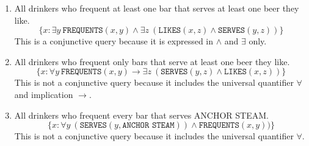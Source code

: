 \begin{enumerate}
  \item All drinkers who frequent at least one bar that serves at least one beer they like.
  \begin{equation*}
    \{x : \exists y \: \texttt{FREQUENTS}(x,y) \land \exists z \: (\texttt{LIKES}(x,z) \land \texttt{SERVES}(y,z))\}
  \end{equation*}
  This is a conjunctive query because it is expressed in $\land$ and $\exists$ only.
  
  \item All drinkers who frequent only bars that serve at least one beer they like.
  \begin{equation*}
    \{x : \forall y \: \texttt{FREQUENTS}(x,y) \rightarrow \exists z \: (\texttt{SERVES}(y,z) \land \texttt{LIKES}(x,z))\}
  \end{equation*}
  This is not a conjunctive query because it includes the universal quantifier $\forall$ and implication $\rightarrow$.
 
  \item All drinkers who frequent every bar that serves ANCHOR STEAM.
  \begin{equation*}
    \{x : \forall y \: (\texttt{SERVES}(y,\texttt{ANCHOR STEAM})) \land \texttt{FREQUENTS}(x,y))\}
  \end{equation*}
  This is not a conjunctive query because it includes the universal quantifier $\forall$.
\end{enumerate}
